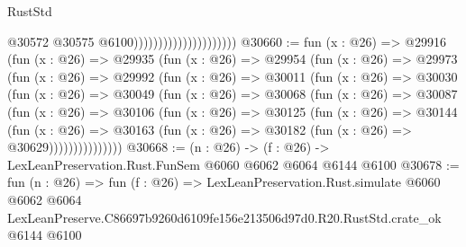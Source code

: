 \begin{lexlean}{RustStd}
\begin{coremodule}
                                              @30572
                                              @30575
                                              @6100)))))))))))))))))))))
@30660 := fun (x : @26) =>
  @29916
    (fun (x : @26) =>
    @29935
      (fun (x : @26) =>
      @29954
        (fun (x : @26) =>
        @29973
          (fun (x : @26) =>
          @29992
            (fun (x : @26) =>
            @30011
              (fun (x : @26) =>
              @30030
                (fun (x : @26) =>
                @30049
                  (fun (x : @26) =>
                  @30068
                    (fun (x : @26) =>
                    @30087
                      (fun (x : @26) =>
                      @30106
                        (fun (x : @26) =>
                        @30125
                          (fun (x : @26) =>
                          @30144
                            (fun (x : @26) =>
                            @30163 (fun (x : @26) => @30182 (fun (x : @26) => @30629)))))))))))))))
@30668 := (n : @26) -> (f : @26) -> LexLeanPreservation.Rust.FunSem @6060 @6062 @6064 @6144 @6100
@30678 := fun (n : @26) =>
  fun (f : @26) =>
  LexLeanPreservation.Rust.simulate
    @6060
    @6062
    @6064
    LexLeanPreserve.C86697b9260d6109fe156e213506d97d0.R20.RustStd.crate_ok
    @6144
    @6100
\end{coremodule}
\end{lexlean}
